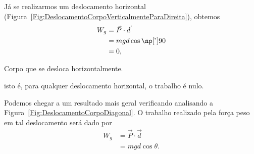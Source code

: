 \noindent{}Já se realizarmos um deslocamento horizontal (Figura~\ref{Fig:DeslocamentoCorpoVerticalmenteParaDireita}), obtemos
\begin{align}
  W_g &= \vec{P}\cdot\vec{d} \\
  &= mgd\cos\degree{90} \\
  &= 0,
\end{align}

\begin{marginfigure}
\centering
{}
\caption{Corpo que se desloca horizontalmente. \label{Fig:DeslocamentoCorpoVerticalmenteParaDireita}}
\end{marginfigure}

\noindent{}isto é, para qualquer deslocamento horizontal, o trabalho é nulo.

Podemos chegar a um resultado mais geral verificando analisando a Figura~\ref{Fig:DeslocamentoCorpoDiagonal}. O trabalho realizado pela força peso em tal deslocamento será dado por
\begin{align}
  W_g &= \vec{P}\cdot\vec{d} \\
  &= mgd\cos\theta.
\end{align}

